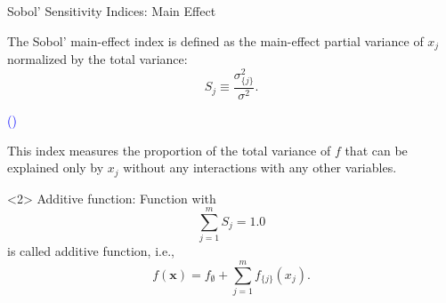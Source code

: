 \documentclass[english,aspectratio=169]{beamer}
\renewcommand{\emph}[1]{\textcolor[HTML]{006d2c}{\fontseries{sb}\selectfont #1}}
\begin{document}





\begin{frame}[fragile]{Sobol' Sensitivity Indices: Main Effect}
\small
  
The \emph{Sobol' main-effect index} is defined as the \emph{main-effect partial variance}
of $x_j$ normalized by the total variance:
\begin{equation*}
  S_j \equiv \frac{\sigma^2_{\{j\}}}{\sigma^2}.
\end{equation*}
{\hfill \raggedright \tiny \textcolor{blue}{(\cite{Sobol1993})}}

\vspace{-0.75em}

\begin{exampleblock}{}
  \centering
  This index measures the proportion of the total variance of $f$
  that can be explained \emph{only by} $x_j$
  without any interactions with any other variables.
\end{exampleblock}

\begin{onlyenv}<2>
  \emph{Additive function}: Function with  
  \begin{equation*}
    \sum_{j = 1}^m S_j = 1.0
  \end{equation*}
  is called additive function, i.e.,
  \begin{equation*}
    f(\bm{x}) = f_\emptyset + \sum_{j = 1}^m f_{\{ j \}} (x_j).
  \end{equation*}    
\end{onlyenv}

\end{frame}
  
\end{document}
